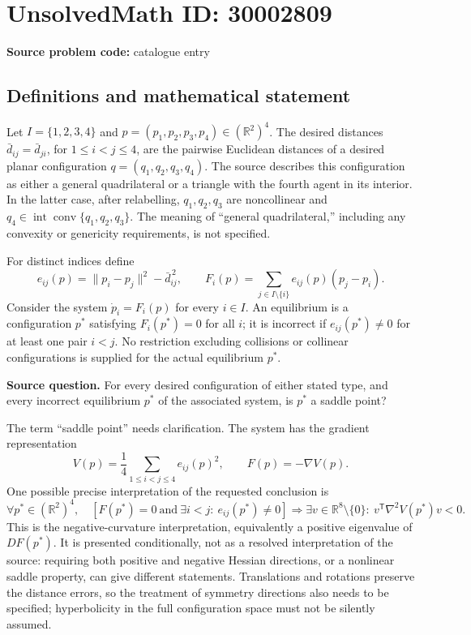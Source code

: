 \documentclass[11pt]{article}
\newcommand{\R}{\mathbb{R}}
\begin{document}
\section*{UnsolvedMath ID: 30002809}
\textbf{Source problem code:} catalogue entry
\subsection{Definitions and mathematical statement}
Let \(I=\{1,2,3,4\}\) and \(p=(p_1,p_2,p_3,p_4)\in(\R^2)^4\). The desired distances \(\bar d_{ij}=\bar d_{ji}\), for \(1\leq i<j\leq4\), are the pairwise Euclidean distances of a desired planar configuration \(q=(q_1,q_2,q_3,q_4)\). The source describes this configuration as either a general quadrilateral or a triangle with the fourth agent in its interior. In the latter case, after relabelling, \(q_1,q_2,q_3\) are noncollinear and \(q_4\in\operatorname{int}\operatorname{conv}\{q_1,q_2,q_3\}\). The meaning of ``general quadrilateral,'' including any convexity or genericity requirements, is not specified.

For distinct indices define
\[
e_{ij}(p)=\lVert p_i-p_j\rVert^2-\bar d_{ij}^{\,2},\qquad
F_i(p)=\sum_{j\in I\setminus\{i\}}e_{ij}(p)(p_j-p_i).
\]
Consider the system \(\dot p_i=F_i(p)\) for every \(i\in I\). An equilibrium is a configuration \(p^*\) satisfying \(F_i(p^*)=0\) for all \(i\); it is incorrect if \(e_{ij}(p^*)\neq0\) for at least one pair \(i<j\). No restriction excluding collisions or collinear configurations is supplied for the actual equilibrium \(p^*\).

\textbf{Source question.} For every desired configuration of either stated type, and every incorrect equilibrium \(p^*\) of the associated system, is \(p^*\) a saddle point?

The term ``saddle point'' needs clarification. The system has the gradient representation
\[
V(p)=\frac14\sum_{1\leq i<j\leq4}e_{ij}(p)^2,
\qquad F(p)=-\nabla V(p).
\]
One possible precise interpretation of the requested conclusion is
\[
\forall p^*\in(\R^2)^4,\quad
\left[F(p^*)=0\ \text{and}\ \exists i<j:\ e_{ij}(p^*)\neq0\right]
\Longrightarrow
\exists v\in\R^8\setminus\{0\}:\
v^{\mathsf T}\nabla^2V(p^*)v<0.
\]
This is the negative-curvature interpretation, equivalently a positive eigenvalue of \(DF(p^*)\). It is presented conditionally, not as a resolved interpretation of the source: requiring both positive and negative Hessian directions, or a nonlinear saddle property, can give different statements. Translations and rotations preserve the distance errors, so the treatment of symmetry directions also needs to be specified; hyperbolicity in the full configuration space must not be silently assumed.
\end{document}
